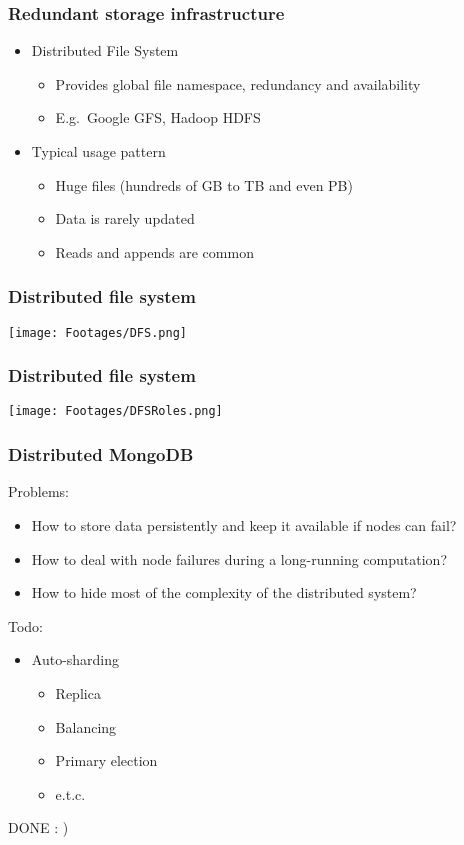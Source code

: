 \documentclass{beamer}
\begin{document}
\begin{frame} \small
\frametitle{Redundant storage infrastructure}
\begin{itemize}
  \item Distributed File System
  \begin{itemize}
    \item Provides global file namespace, redundancy and availability
    \item E.g.\ Google GFS, Hadoop HDFS
  \end{itemize}
  \item Typical usage pattern
  \begin{itemize}
    \item Huge files (hundreds of GB to TB and even PB)
    \item Data is rarely updated
    \item Reads and appends are common
  \end{itemize}
\end{itemize}
\end{frame}
\begin{frame} \small
\frametitle{Distributed file system}
\texttt{[image: Footages/DFS.png]}
\end{frame}
\begin{frame} \small
\frametitle{Distributed file system}
\texttt{[image: Footages/DFSRoles.png]}
\end{frame}
\begin{frame} \small
\frametitle{Distributed MongoDB}
Problems:
\begin{itemize}
\item How to store data persistently and keep it available if nodes can fail?
\item How to deal with node failures during a long-running computation?\\
\item How to hide most of the complexity of the distributed system?\\
\end{itemize}
Todo:
\begin{itemize}
\item Auto-sharding
  \begin{itemize}
    \item Replica
    \item Balancing
    \item Primary election
    \item e.t.c.
  \end{itemize}
\end{itemize}
DONE : )
\end{frame}
\end{document}
